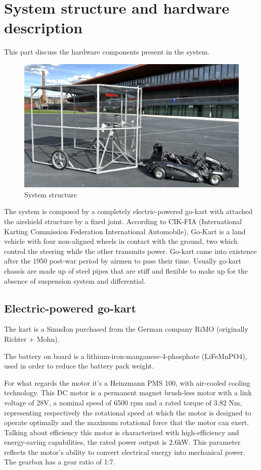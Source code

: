 \documentclass[a4paper,12pt,oneside]{book}
\begin{document}
\section{System structure and hardware description}
This part discuss the hardware components present in the system.
\begin{figure}
\centering
\includegraphics[scale=0.3]{Windshield.png}
\caption{System structure}
\end{figure}

The system is composed by a completely electric-powered go-kart with attached the airshield structure by a fixed joint. 
According to CIK-FIA (International Karting Commission Federation International Automobile), Go-Kart is a land vehicle with four non-aligned wheels in contact with the ground, two which control the steering while the other transmits power.
Go-kart came into existence after the 1950 post-war period by airmen to pass their time.
Usually go-kart chassis are made up of steel pipes that are stiff and flexible to make up for the absence of suspension system and differential.

\subsection{Electric-powered go-kart}
The kart is a SinusIon purchased from the German company RiMO (originally Richter + Mohn). 

\bigskip
The battery on board is a lithium-iron-manganese-4-phosphate (LiFeMnPO4), used in order to reduce the battery pack weight.

\bigskip
For what regards the motor it's a Heinzmann PMS 100, with air-cooled cooling technology. 
This DC motor is a permanent magnet brush-less motor with a link voltage of 28V, a nominal speed of 6500 rpm and a rated torque of 3.82 Nm, representing respectively the rotational speed at which the motor is designed to operate optimally and the maximum rotational force that the motor can exert.
Talking about efficiency this motor is characterized with high-efficiency and energy-saving capabilities, the rated power output is 2.6kW. 
This parameter reflects the motor's ability to convert electrical energy into mechanical power.
The gearbox has a gear ratio of 1:7.
\end{document}
